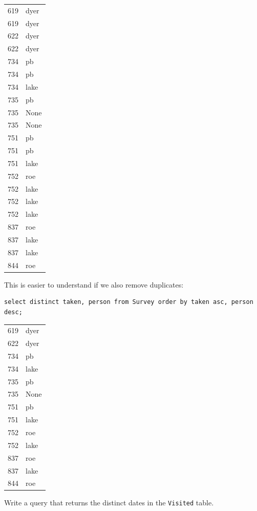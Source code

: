 \documentclass{book}
\begin{document}
\begin{tabular}{ll}
619 & dyer \\
619 & dyer \\
622 & dyer \\
622 & dyer \\
734 & pb \\
734 & pb \\
734 & lake \\
735 & pb \\
735 & None \\
735 & None \\
751 & pb \\
751 & pb \\
751 & lake \\
752 & roe \\
752 & lake \\
752 & lake \\
752 & lake \\
837 & roe \\
837 & lake \\
837 & lake \\
844 & roe \\
\end{tabular}

This is easier to understand if we also remove duplicates:

\begin{verbatim}
select distinct taken, person from Survey order by taken asc, person desc;
\end{verbatim}

\begin{tabular}{ll}
619 & dyer \\
622 & dyer \\
734 & pb \\
734 & lake \\
735 & pb \\
735 & None \\
751 & pb \\
751 & lake \\
752 & roe \\
752 & lake \\
837 & roe \\
837 & lake \\
844 & roe \\
\end{tabular}

\begin{challenge}
  Write a query that returns the distinct dates in the \texttt{Visited}
  table.
\end{challenge}
\end{document}

